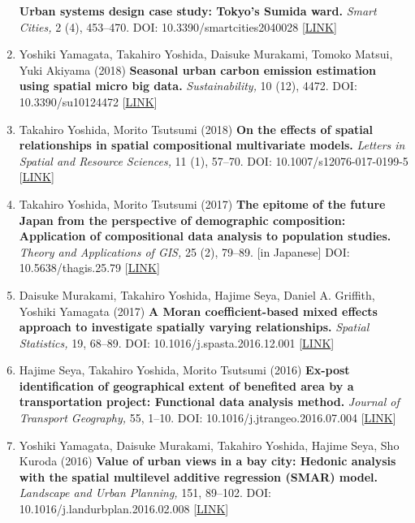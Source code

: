\documentclass[]{book}
\begin{document}
\begin{enumerate}
  \textbf{Urban systems design case study: Tokyo's Sumida ward.}
  \emph{Smart Cities,} 2 (4), 453--470.
  DOI: 10.3390/smartcities2040028 {[}\href{https://www.mdpi.com/2624-6511/2/4/28}{LINK}{]}
\item
  Yoshiki Yamagata, Takahiro Yoshida, Daisuke Murakami, Tomoko Matsui, Yuki Akiyama (2018)
  \textbf{Seasonal urban carbon emission estimation using spatial micro big data.}
  \emph{Sustainability,} 10 (12), 4472.
  DOI: 10.3390/su10124472 {[}\href{https://www.mdpi.com/2071-1050/10/12/4472}{LINK}{]}
\item
  Takahiro Yoshida, Morito Tsutsumi (2018)
  \textbf{On the effects of spatial relationships in spatial compositional multivariate models.}
  \emph{Letters in Spatial and Resource Sciences,} 11 (1), 57--70.
  DOI: 10.1007/s12076-017-0199-5 {[}\href{https://link.springer.com/article/10.1007/s12076-017-0199-5}{LINK}{]}
\item
  Takahiro Yoshida, Morito Tsutsumi (2017)
  \textbf{The epitome of the future Japan from the perspective of demographic composition: Application of compositional data analysis to population studies.}
  \emph{Theory and Applications of GIS,} 25 (2), 79--89. {[}in Japanese{]}
  DOI: 10.5638/thagis.25.79 {[}\href{https://www.jstage.jst.go.jp/article/thagis/25/2/25_79/_article/-char/en}{LINK}{]}
\item
  Daisuke Murakami, Takahiro Yoshida, Hajime Seya, Daniel A. Griffith, Yoshiki Yamagata (2017)
  \textbf{A Moran coefficient-based mixed effects approach to investigate spatially varying relationships.}
  \emph{Spatial Statistics,} 19, 68--89.
  DOI: 10.1016/j.spasta.2016.12.001 {[}\href{http://www.sciencedirect.com/science/article/pii/S2211675316301798}{LINK}{]}
\item
  Hajime Seya, Takahiro Yoshida, Morito Tsutsumi (2016)
  \textbf{Ex-post identification of geographical extent of benefited area by a transportation project: Functional data analysis method.}
  \emph{Journal of Transport Geography,} 55, 1--10.
  DOI: 10.1016/j.jtrangeo.2016.07.004 {[}\href{http://www.sciencedirect.com/science/article/pii/S0966692316303763}{LINK}{]}
\item
  Yoshiki Yamagata, Daisuke Murakami, Takahiro Yoshida, Hajime Seya, Sho Kuroda (2016)
  \textbf{Value of urban views in a bay city: Hedonic analysis with the spatial multilevel additive regression (SMAR) model.}
  \emph{Landscape and Urban Planning,} 151, 89--102.
  DOI: 10.1016/j.landurbplan.2016.02.008 {[}\href{http://www.sciencedirect.com/science/article/pii/S0169204616000232}{LINK}{]}
\end{enumerate}
\end{document}

